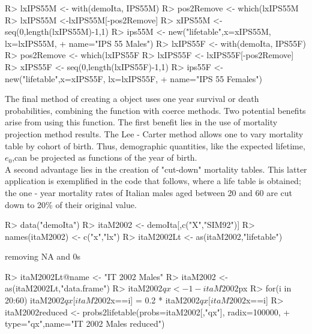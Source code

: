 \documentclass[nojss]{jss}
\begin{document}
\begin{Schunk}
\begin{Sinput}
R> lxIPS55M <- with(demoIta, IPS55M)
R> pos2Remove <- which(lxIPS55M %
R> lxIPS55M <-lxIPS55M[-pos2Remove]
R> xIPS55M <-seq(0,length(lxIPS55M)-1,1)
R> ips55M <- new("lifetable",x=xIPS55M, lx=lxIPS55M, 
+  		name="IPS 55 Males")
R> lxIPS55F <- with(demoIta, IPS55F)
R> pos2Remove <- which(lxIPS55F %
R> lxIPS55F <- lxIPS55F[-pos2Remove]
R> xIPS55F <- seq(0,length(lxIPS55F)-1,1)
R> ips55F <- new("lifetable",x=xIPS55F, lx=lxIPS55F, 
+  		name="IPS 55 Females")
\end{Sinput}
\end{Schunk}


The final method of creating a  object uses 
one year survival or death probabilities, combining the  function with 
 coerce methods. Two potential benefits arise from using this function. The first benefit lies in the use of mortality projection method
results. The Lee - Carter method \citep{Lee1992} allows one to vary mortality table
by cohort of birth.
Thus, demographic quantities, like the expected lifetime, $e_0$,can be projected as functions of the year of birth.\\
A second advantage lies in the creation of "cut-down" mortality tables. This latter
application is exemplified in the code that follows, where a  life
table is obtained; the one - year mortality rates of Italian males aged between 20 and 60 are cut down to 20\% of their original value.

\begin{Schunk}
\begin{Sinput}
R> data("demoIta")
R> itaM2002 <- demoIta[,c("X","SIM92")]
R> names(itaM2002) <- c("x","lx")
R> itaM2002Lt <- as(itaM2002,"lifetable")
\end{Sinput}
\begin{Soutput}
removing NA and 0s
\end{Soutput}
\begin{Sinput}
R> itaM2002Lt@name <- "IT 2002 Males"
R> itaM2002 <- as(itaM2002Lt,"data.frame")
R> itaM2002$qx <- 1-itaM2002$px
R> for(i in 20:60) itaM2002$qx[itaM2002$x==i] = 0.2 * itaM2002$qx[itaM2002$x==i]
R> itaM2002reduced <- probs2lifetable(probs=itaM2002[,"qx"], radix=100000,
+  		type="qx",name="IT 2002 Males reduced")
\end{Sinput}
\end{Schunk}
\end{document}

